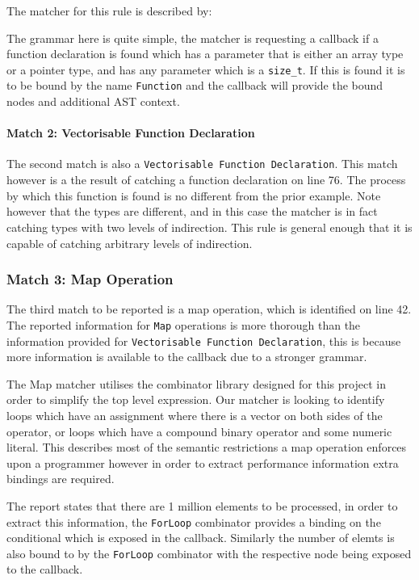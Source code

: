 The matcher for this rule is described by:

The grammar here is quite simple, the matcher is requesting a callback if a function declaration is
found which has a parameter that is either an array type or a pointer type, and has any parameter
which is a \lstinline{size_t}. If this is found it is to be bound by the name \lstinline{Function}
and the callback will provide the bound nodes and additional AST context.

\paragraph{Match 2: Vectorisable Function Declaration}
The second match is also a \lstinline{Vectorisable Function Declaration}. This match however is a
the result of catching a function declaration on line 76. The process by which this function is
found is no different from the prior example. Note however that the types are different, and in this
case the matcher is in fact catching types with two levels of indirection. This rule is general
enough that it is capable of catching arbitrary levels of indirection.

\subsubsection{Match 3: Map Operation}
The third match to be reported is a map operation, which is identified on line 42. The reported
information for \lstinline{Map} operations is more thorough than the information provided for
\lstinline{Vectorisable Function Declaration}, this is because more information is available to the
callback due to a stronger grammar.

The Map matcher utilises the combinator library designed for this project in order to simplify the
top level expression. Our matcher is looking to identify loops which have an assignment where there
is a vector on both sides of the operator, or loops which have a compound binary operator and some
numeric literal. This describes most of the semantic restrictions a map operation enforces upon a
programmer however in order to extract performance information extra bindings are required.

The report states that there are 1 million elements to be processed, in order to extract this
information, the \lstinline{ForLoop} combinator provides a binding on the conditional which is
exposed in the callback. Similarly the number of elemts is also bound to by the \lstinline{ForLoop}
combinator with the respective node being exposed to the callback.

